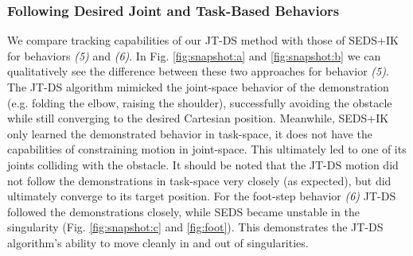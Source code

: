 \documentclass[letterpaper, 10 pt, conference,fleqn]{ieeeconf}
\begin{document}
\subsubsection{Following Desired Joint and Task-Based Behaviors}
We compare tracking capabilities of our JT-DS method with those of SEDS+IK for behaviors \textit{(5)} and \textit{(6)}. In Fig. \ref{fig:snapshot:a} and \ref{fig:snapshot:b} we can qualitatively see the difference between these two approaches for behavior \textit{(5)}. The JT-DS algorithm mimicked the joint-space behavior of the demonstration (e.g. folding the elbow, raising the shoulder), successfully avoiding the obstacle while still converging to the desired Cartesian position. Meanwhile, SEDS+IK only learned the demonstrated behavior in task-space, it does not have the capabilities of constraining motion in joint-space. This ultimately led to one of its joints colliding with the obstacle. It should be noted that the JT-DS motion did not follow the demonstrations in task-space very closely (as expected), but did ultimately converge to its target position. For the foot-step behavior \textit{(6)} JT-DS followed the demonstrations closely, while SEDS became unstable in the singularity (Fig. \ref{fig:snapshot:c} and \ref{fig:foot}). This demonstrates the JT-DS algorithm's ability to move cleanly in and out of singularities. %
\end{document}
